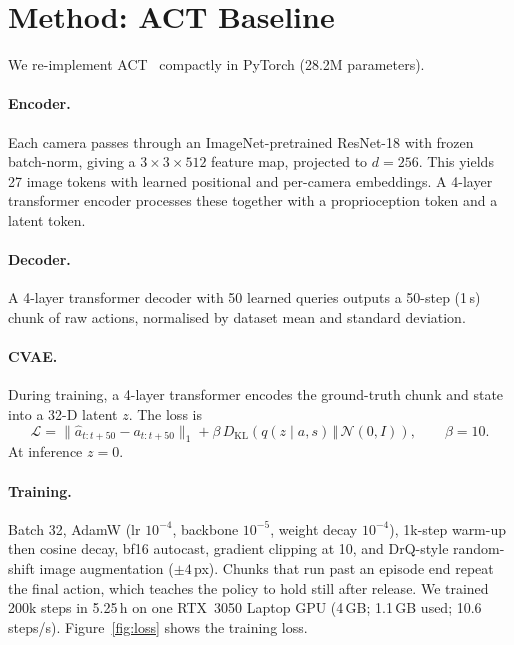 \documentclass[11pt,a4paper]{article}
\begin{document}
\section{Method: ACT Baseline}

We re-implement ACT~\cite{zhao2023act} compactly in PyTorch (28.2M
parameters).

\paragraph{Encoder.} Each camera passes through an ImageNet-pretrained
ResNet-18 with frozen batch-norm, giving a $3\times3\times512$ feature map,
projected to $d=256$. This yields 27 image tokens with learned positional
and per-camera embeddings. A 4-layer transformer encoder processes these
together with a proprioception token and a latent token.

\paragraph{Decoder.} A 4-layer transformer decoder with 50 learned queries
outputs a 50-step (1\,s) chunk of raw actions, normalised by dataset mean
and standard deviation.

\paragraph{CVAE.} During training, a 4-layer transformer encodes the
ground-truth chunk and state into a 32-D latent $z$. The loss is
\begin{equation}
  \mathcal{L} = \lVert \hat a_{t:t+50} - a_{t:t+50}\rVert_1
  + \beta\, D_{\mathrm{KL}}\!\left(q(z\mid a, s)\,\Vert\,\mathcal{N}(0,I)\right),
  \qquad \beta = 10 .
\end{equation}
At inference $z=0$.

\paragraph{Training.} Batch 32, AdamW (lr $10^{-4}$, backbone $10^{-5}$,
weight decay $10^{-4}$), 1k-step warm-up then cosine decay, bf16 autocast,
gradient clipping at 10, and DrQ-style random-shift image augmentation
($\pm4$\,px). Chunks that run past an episode end repeat the final action,
which teaches the policy to hold still after release. We trained 200k steps
in 5.25\,h on one RTX~3050 Laptop GPU (4\,GB; 1.1\,GB used; 10.6
steps/s). Figure~\ref{fig:loss} shows the training loss.
\end{document}
